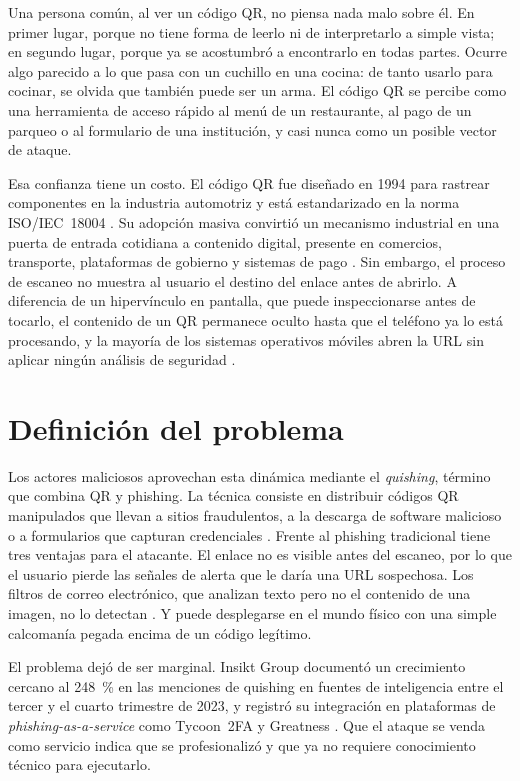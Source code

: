 Una persona común, al ver un código QR, no piensa nada malo sobre él. En primer lugar, porque no tiene forma de leerlo ni de interpretarlo a simple vista; en segundo lugar, porque ya se acostumbró a encontrarlo en todas partes. Ocurre algo parecido a lo que pasa con un cuchillo en una cocina: de tanto usarlo para cocinar, se olvida que también puede ser un arma. El código QR se percibe como una herramienta de acceso rápido al menú de un restaurante, al pago de un parqueo o al formulario de una institución, y casi nunca como un posible vector de ataque.

Esa confianza tiene un costo. El código QR fue diseñado en 1994 para rastrear componentes en la industria automotriz y está estandarizado en la norma ISO/IEC~18004 \cite{iso18004_2015,iso18004_2024}. Su adopción masiva convirtió un mecanismo industrial en una puerta de entrada cotidiana a contenido digital, presente en comercios, transporte, plataformas de gobierno y sistemas de pago \cite{krombholz2014qr}. Sin embargo, el proceso de escaneo no muestra al usuario el destino del enlace antes de abrirlo. A diferencia de un hipervínculo en pantalla, que puede inspeccionarse antes de tocarlo, el contenido de un QR permanece oculto hasta que el teléfono ya lo está procesando, y la mayoría de los sistemas operativos móviles abren la URL sin aplicar ningún análisis de seguridad \cite{krombholz2014qr,vidas2013qrishing}.

\section{Definición del problema}

Los actores maliciosos aprovechan esta dinámica mediante el \emph{quishing}, término que combina QR y phishing. La técnica consiste en distribuir códigos QR manipulados que llevan a sitios fraudulentos, a la descarga de software malicioso o a formularios que capturan credenciales \cite{insikt2024qrcode,unit42_2023qr}. Frente al phishing tradicional tiene tres ventajas para el atacante. El enlace no es visible antes del escaneo, por lo que el usuario pierde las señales de alerta que le daría una URL sospechosa. Los filtros de correo electrónico, que analizan texto pero no el contenido de una imagen, no lo detectan \cite{unit42_2023qr}. Y puede desplegarse en el mundo físico con una simple calcomanía pegada encima de un código legítimo.

El problema dejó de ser marginal. Insikt Group documentó un crecimiento cercano al 248~\% en las menciones de quishing en fuentes de inteligencia entre el tercer y el cuarto trimestre de 2023, y registró su integración en plataformas de \emph{phishing-as-a-service} como Tycoon~2FA y Greatness \cite{insikt2024qrcode}. Que el ataque se venda como servicio indica que se profesionalizó y que ya no requiere conocimiento técnico para ejecutarlo.

